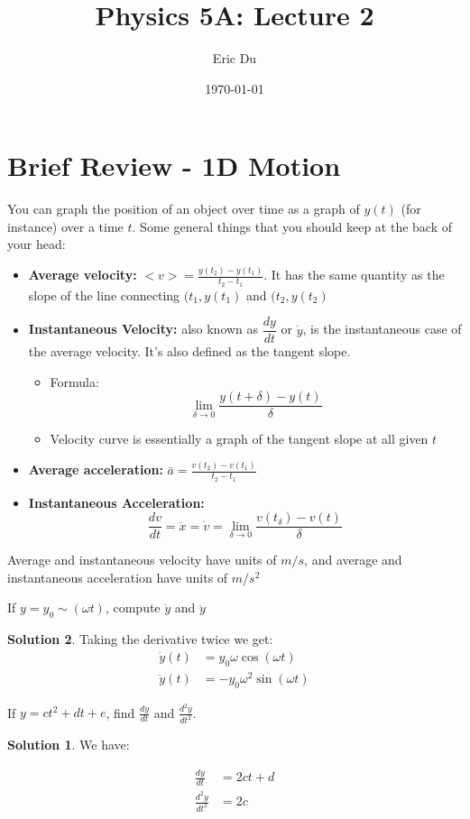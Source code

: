 \documentclass{article}
\title{Physics 5A: Lecture 2}
\author{Eric Du}
\date{\today}
\theoremstyle{definition}
\newtheorem*{solution}{\color{blue}Solution}
\numberwithin{equation}{section}
\numberwithin{definition}{section}
\begin{document}
	\maketitle 
	
	\section{Brief Review - 1D Motion}
	
	You can graph the position of an object over time as a graph of $y(t)$ (for instance) over a time $t$. Some general things that you should keep at the back of your head:
	
	\begin{itemize}
		\item \textbf{Average velocity:} $<v> = \frac{y(t_2) - y(t_1)}{t_2-t_1}$. It has the same quantity as the slope of the line connecting $(t_1, y(t_1)$ and $(t_2, y(t_2)$
		\item \textbf{Instantaneous Velocity:} also known as $\dfrac{dy}{dt}$ or $\dot{y}$, is the instantaneous case of the average velocity. It's also defined as the tangent slope. 
		\begin{itemize}
			\item Formula: \[\lim_{\delta \to 0} \dfrac{y(t+\delta) - y(t)}{\delta}\]
			\item Velocity curve is essentially a graph of the tangent slope at all given $t$
			\end{itemize}
		\item \textbf{Average acceleration:} $\bar{a} = \frac{v(t_2)- v(t_1)}{t_2 - t_1}$
		\item \textbf{Instantaneous Acceleration:} \[\frac{dv}{dt} = \ddot{x} = \dot{v} = \lim_{\delta \to 0} \frac{v(t_\delta) - v(t)}{\delta}\] 
	\end{itemize}
	Average and instantaneous velocity have units of $m/s$, and average and instantaneous acceleration have units of $m/s^2$
	
	\begin{example}
		If $y = y_0 \sim(\omega t)$, compute $\dot{y}$ and $\ddot{y}$
		
		\end{example}
	
	\begin{solution}
		Taking the derivative twice we get:
		\begin{align*}
			\dot{y}(t) &= y_0\omega \cos (\omega t) \\
			\ddot{y}(t) &= -y_0 \omega^2 \sin(\omega t) 
		\end{align*}
	
	\begin{example}
		If $y = ct^2 + dt + e$, find $\frac{dy}{dt}$ and $\frac{d^2y}{dt^2}$.
		\end{example}
	
	\begin{solution}
		We have:
		
		\begin{align*}
			\frac{dy}{dt}&= 2ct + d\\
			\frac{d^2y}{dt^2} &= 2c
		\end{align*}
	\end{solution}
	\end{solution}
\end{document}
